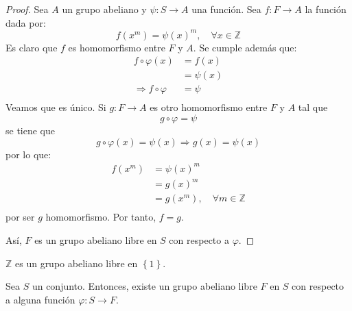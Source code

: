\documentclass[12pt]{report}
\theoremstyle{largebreak}
\newcommand\cf[3]{\ensuremath{#1:#2\rightarrow#3}}
\begin{document}
    \begin{proof}
        Sea $A$ un grupo abeliano y $\cf{\psi}{S}{A}$ una función. Sea $\cf{f}{F}{A}$ la función dada por:
        \begin{equation*}
            f(x^m)=\psi(x)^m,\quad\forall x\in\mathbb{Z}
        \end{equation*}
        Es claro que $f$ es homomorfismo entre $F$ y $A$. Se cumple además que:
        \begin{equation*}
            \begin{split}
                f\circ\varphi(x)&=f(x)\\
                &=\psi(x)\\
                \Rightarrow f\circ\varphi&=\psi\\
            \end{split}
        \end{equation*}
        Veamos que es único. Si $\cf{g}{F}{A}$ es otro homomorfismo entre $F$ y $A$ tal que
        \begin{equation*}
            g\circ\varphi=\psi
        \end{equation*}
        se tiene que
        \begin{equation*}
            g\circ\varphi(x)=\psi(x)\Rightarrow g(x)=\psi(x)
        \end{equation*}
        por lo que:
        \begin{equation*}
            \begin{split}
                f(x^m)&=\psi(x)^m\\
                &=g(x)^m\\
                &=g(x^m),\quad\forall m\in\mathbb{Z} \\
            \end{split}
        \end{equation*}
        por ser $g$ homomorfismo. Por tanto, $f=g$.

        Así, $F$ es un grupo abeliano libre en $S$ con respecto a $\varphi$.
    \end{proof}

    \begin{exa}
        $\mathbb{Z}$ es un grupo abeliano libre en $\left\{1 \right\}$.
    \end{exa}

    \begin{propo}
        Sea $S$ un conjunto. Entonces, existe un grupo abeliano libre $F$ en $S$ con respecto a alguna función $\cf{\varphi}{S}{F}$.
    \end{propo}
\end{document}
